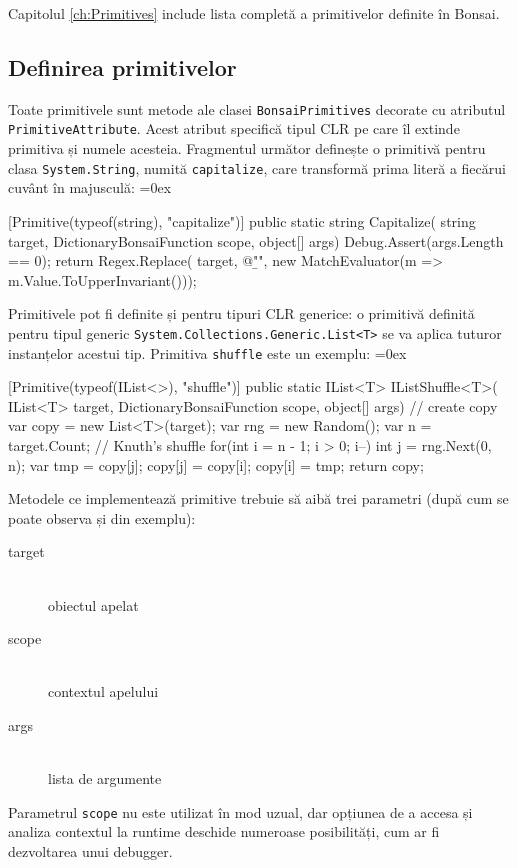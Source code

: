 \documentclass[12pt,a4paper]{memoir}
\renewcommand{\c}{\texttt}
\newenvironment{code}
{
\definecolor{shadecolor}{gray}{0.91}
\topsep=0ex
\relax
\shaded
\verbatim
}
{
\endverbatim
\endshaded
}
\begin{document}
Capitolul \ref{ch:Primitives} include lista completă a primitivelor definite în Bonsai.

\subsection{Definirea primitivelor}

Toate primitivele sunt metode ale clasei \c{BonsaiPrimitives} decorate cu atributul \c{PrimitiveAttribute}. Acest atribut specifică tipul CLR pe care îl extinde primitiva și numele acesteia. Fragmentul următor definește o primitivă pentru clasa \c{System.String}, numită \c{capitalize}, care transformă prima literă a fiecărui cuvânt în majusculă:
\begin{code}
[Primitive(typeof(string), "capitalize")]
public static string Capitalize(
  string target,
  DictionaryBonsaiFunction scope,
  object[] args)
{
  Debug.Assert(args.Length == 0);
  return Regex.Replace(
    target, @"\b\w",
    new MatchEvaluator(m => m.Value.ToUpperInvariant()));
}
\end{code}

Primitivele pot fi definite și pentru tipuri CLR generice: o primitivă definită pentru tipul generic \c{System.Collections.Generic.List<T>} se va aplica tuturor instanțelor acestui tip. Primitiva \c{shuffle} este un exemplu:
\begin{code}
[Primitive(typeof(IList<>), "shuffle")]
public static IList<T> IListShuffle<T>(
  IList<T> target,
  DictionaryBonsaiFunction scope,
  object[] args)
{
  // create copy
  var copy = new List<T>(target);
  var rng = new Random();
  var n = target.Count;
  // Knuth's shuffle
  for(int i = n - 1; i > 0; i--) {
    int j = rng.Next(0, n);
    var tmp = copy[j];
    copy[j] = copy[i];
    copy[i] = tmp;
  }
  return copy;
}
\end{code}

Metodele ce implementează primitive trebuie să aibă trei parametri (după cum se poate observa și din exemplu):
\begin{description}
\item[target]\hfill\\ obiectul apelat
\item[scope]\hfill\\ contextul apelului
\item[args]\hfill\\ lista de argumente
\end{description}

Parametrul \c{scope} nu este utilizat în mod uzual, dar opțiunea de a accesa și analiza contextul la runtime deschide numeroase posibilități, cum ar fi dezvoltarea unui debugger.
\end{document}
